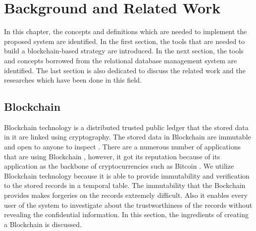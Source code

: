 \chapter{Background and Related Work} \label{ch:background}
	In this chapter, the concepts and definitions which are needed to implement the proposed system are identified. In the first section, the tools that are needed to build a blockchain-based strategy are introduced. In the next section, the tools and concepts borrowed from the relational database management system are identified. The last section is also dedicated to discuss the related work and the researches which have been done in this field.

		\section{Blockchain} \label{sec:blockchain}
		Blockchain technology is a distributed trusted public ledger that the stored data in it are linked using cryptography. The stored data in Blockchain are immutable and open to anyone to inspect \cite{OECD2016Science}. There are a numerous number of applications that are using Blockchain \cite{dhillon2017blockchain}, however, ‌it got its reputation because of its application as the backbone of cryptocurrencies such as Bitcoin \cite{nakamoto2008bitcoin}. 
		We utilize Blockchain technology because it is able to provide immutability and verification to the stored records in a temporal table. The immutability that the Bockchain provides makes forgeries on the records extremely difficult. Also it enables every user of the system to investigate about the trustworthiness of the records without revealing the confidential information. In this section, the ingredients of creating a Blockchain is discussed.

